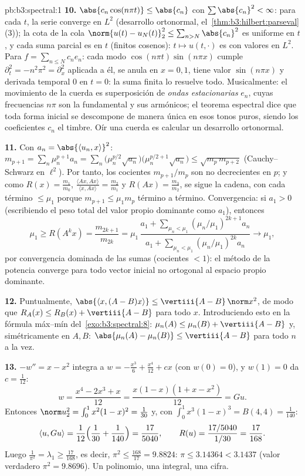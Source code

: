 \begin{solution}{pb:b3:spectral:1}
\textbf{10.} $\abs{c_n\cos(n\pi t)} \leq \abs{c_n}$ con
$\sum\abs{c_n}^2 < \infty$: para cada $t$, la serie converge en $L^2$
(desarrollo ortonormal, el~\cref{thm:b3:hilbert:parseval}(3)); la cota
de la cola $\norm{u(t) - u_N(t)}_2^2 \leq \sum_{n>N}\abs{c_n}^2$ es
uniforme en $t$, y cada suma parcial es
 en $t$ (finitos cosenos):
$t \mapsto u(t,\cdot)$ es 
con valores en $L^2$. Para $f = \sum_{n\leq N}c_ne_n$: cada modo
$\cos(n\pi t)\sin(n\pi x)$ cumple $\partial_t^2 =
-n^2\pi^2 = \partial_x^2$ aplicada a él, se anula en $x = 0,
1$, tiene valor $\sin(n\pi x)$ y derivada temporal $0$ en $t =
0$: la suma finita lo resuelve todo. Musicalmente: el movimiento de la
cuerda es superposición de \emph{ondas estacionarias} $e_n$, cuyas
frecuencias $n\pi$ son la fundamental y sus armónicos; el teorema
espectral dice que toda forma inicial se descompone de manera única en
esos tonos puros, siendo los coeficientes $c_n$ el timbre. Oír una
cuerda es calcular un desarrollo ortonormal.

\textbf{11.} Con $a_n = \abs{\langle u_n, x\rangle}^2$:
$m_{p+1} = \sum_n\mu_n^{p+1}a_n = \sum_n\bigl(\mu_n^{p/2}
\sqrt{a_n}\bigr)\bigl(\mu_n^{p/2+1}\sqrt{a_n}\bigr) \leq
\sqrt{m_p\,m_{p+2}}$ (Cauchy--Schwarz en $\ell^2$). Por tanto, los
cocientes $m_{p+1}/m_p$ son no decrecientes en $p$; y como
$R(x) = \frac{m_1}{m_0}$, $\frac{\langle Ax, Ax\rangle}
{\langle x, Ax\rangle} = \frac{m_2}{m_1}$ y $R(Ax) =
\frac{m_3}{m_2}$, se sigue la cadena, con cada término $\leq \mu_1$
porque $m_{p+1} \leq \mu_1m_p$ término a término. Convergencia: si
$a_1 > 0$ (escribiendo el peso total del valor propio dominante como
$a_1$), entonces
\[
\mu_1 \geq R(A^kx) = \frac{m_{2k+1}}{m_{2k}} =
\mu_1\,\frac{a_1 + \sum_{\mu_n<\mu_1}(\mu_n/\mu_1)^{2k+1}
a_n}{a_1 + \sum_{\mu_n<\mu_1}(\mu_n/\mu_1)^{2k}a_n}
\longrightarrow \mu_1,
\]
por convergencia dominada de las sumas (cocientes $< 1$): el método de
la potencia converge para todo vector inicial no ortogonal al espacio
propio dominante.

\textbf{12.} Puntualmente, $\abs{\langle x, (A - B)x\rangle}
\leq \vertiii{A - B}\,\norm x^2$, de modo que $R_A(x) \leq R_B(x) +
\vertiii{A - B}$ para todo $x$. Introduciendo esto en la fórmula
máx--mín del~\cref{exo:b3:spectral:8}: $\mu_n(A)
\leq \mu_n(B) + \vertiii{A - B}$ y, simétricamente en $A,
B$: $\abs{\mu_n(A) - \mu_n(B)} \leq \vertiii{A - B}$ para todo $n$ a la
vez.

\textbf{13.} $-w'' = x - x^2$ integra a $w = -\frac{x^3}6
+ \frac{x^4}{12} + cx$ (con $w(0) = 0$), y $w(1) = 0$ da
$c = \frac1{12}$:
\[
w = \frac{x^4 - 2x^3 + x}{12} = \frac{x(1-x)(1 + x -
x^2)}{12} = Gu .
\]
Entonces $\norm u_2^2 = \int_0^1x^2(1-x)^2 = \frac1{30}$ y, con
$\int_0^1x^3(1-x)^3 = B(4,4) = \frac1{140}$:
\[
\langle u, Gu\rangle = \frac1{12}\Bigl(\frac1{30} +
\frac1{140}\Bigr) = \frac{17}{5040},
\qquad
R(u) = \frac{17/5040}{1/30} = \frac{17}{168} .
\]
Luego $\frac1{\pi^2} = \lambda_1 \geq \frac{17}{168}$, es decir,
$\pi^2 \leq \frac{168}{17} = 9.8824$: $\pi \leq 3.14364 <
3.1437$ (valor verdadero $\pi^2 = 9.8696$). Un polinomio, una integral,
una cifra.


\end{solution}
